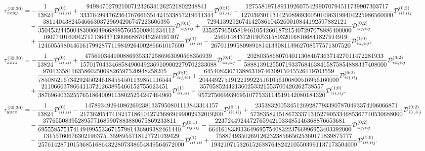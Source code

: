\documentclass[11pt]{article}
\begin{document}
\begin{align}
\\[0.6em]
\tau^{(30,30)}_{xxyy} &= -\frac{1}{13824} \mathcal{D}^{(0)}_{iii,iii}
+ \frac{94984702792100712326341262521802248841}{333764994762364767666351424533857219641344} \mathcal{D}^{(0;1)}_{iii,iij}
- \frac{127558197189119260754299070794511739907303717}{127039301131425089693005010963199404225986560000} \mathcal{D}^{(0;2)}_{iii,iij} \notag\\
&\quad
- \frac{3811404382454666303729694206747223606395}{3504532445004830060496689957605500806234112} \mathcal{D}^{(0;1)}_{iij,iij}
+ \frac{72941392926741425861045260010844192597882121}{23525796505819461054260187215407297078886400000} \mathcal{D}^{(0;2)}_{iij,iij} \notag\\
&\quad
+ \frac{1607740160042717136437130066887045259597407}{1246055980446161799287711984926400286661017600} \mathcal{D}^{(1)}_{iii,iii}
- \frac{256014843720190531580320168166841827914919}{26701199580989181413308113962708577571307520} \mathcal{D}^{(1;0)}_{iii,iij},
\\[0.6em]
\tau^{(30,30)}_{xxzz} &= -\frac{1}{13824} \mathcal{D}^{(0)}_{iii,iii}
+ \frac{4756903441008869353372586963090568356939}{1570170433468584900492369109002279702233088} \mathcal{D}^{(0;1)}_{iii,iij}
- \frac{2028035868070401130846736371427011472281933}{588813912550719337684638415875854888337408000} \mathcal{D}^{(0;2)}_{iii,iij} \notag\\
&\quad
- \frac{970133581163586025009826597520948258205}{785085216734292450246184554501139851116544} \mathcal{D}^{(0;1)}_{iij,iij}
+ \frac{64540823071388631974630915045526119703559}{20444927519122199225161056106800516956160000} \mathcal{D}^{(0;2)}_{iij,iij} \notag\\
&\quad
+ \frac{2110666378664113721263895466152755623451}{387696403325576518640091138025254247464960} \mathcal{D}^{(1)}_{iii,iii}
- \frac{357058524421360253321553700426262738557}{9572750699396951077533114519142080184320} \mathcal{D}^{(1;0)}_{iii,iij},
\\[0.6em]
\tau^{(30,30)}_{yyzz} &= -\frac{1}{13824} \mathcal{D}^{(0)}_{iii,iii}
- \frac{147893492940862692381337950801113843314157}{217362054741921718610427236869199002932019200} \mathcal{D}^{(0;1)}_{iii,iij}
+ \frac{235383200534512692877933907870493374206066871}{573835824518673337131527905334685367740530688000} \mathcal{D}^{(0;2)}_{iii,iij} \notag\\
&\quad
- \frac{377655083952895771689907883880675869233811}{695558575174149499553367157981436809382461440} \mathcal{D}^{(0;1)}_{iij,iij}
- \frac{22372449244727659421033485146368876653681}{664161833933649695754083223766996953403392000} \mathcal{D}^{(0;2)}_{iij,iij} \notag\\
&\quad
- \frac{1315576067630219637513598955718127721039429}{2576142871015368516864322807338654849564672000} \mathcal{D}^{(1)}_{iii,iii}
+ \frac{7588749350269126232385665625360171839875777}{1932107153261526387648242105503991137173504000} \mathcal{D}^{(1;0)}_{iii,iij}.
\end{align}
\end{document}
